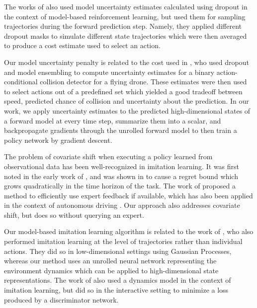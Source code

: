 \documentclass{article} %
\begin{document}
The works of \citep{DeepPilco, Chua2018} also used model uncertainty estimates calculated using dropout in the context of model-based reinforcement learning, but used them for sampling trajectories during the forward prediction step. Namely, they applied different dropout masks to simulate different state trajectories which were then averaged to produce a cost estimate used to select an action. 

Our model uncertainty penalty is related to the cost used in \citep{Kahn2017}, who used dropout and model ensembling to compute uncertainty estimates for a binary action-conditional collision detector for a flying drone. These estimates were then used to select actions out of a predefined set which yielded a good tradeoff between speed, predicted chance of collision and uncertainty about the prediction. In our work, we apply uncertainty estimates to the predicted high-dimensional states of a forward model at every time step, summarize them into a scalar, and backpropagate gradients through the unrolled forward model to then train a policy network by gradient descent.


The problem of covariate shift when executing a policy learned from observational data has been well-recognized in imitation learning.
It was first noted in the early work of \citep{Pomerleau91}, and was shown in \citep{Ross2010EfficientRF} to cause a regret bound which grows quadratically in the time horizon of the task.
The work of \citep{Dagger} proposed a method to efficiently use expert feedback if available, which has also been applied in the context of autonomous driving \citep{Zhang16}.
Our approach also addresses covariate shift, but does so without querying an expert.

Our model-based imitation learning algorithm is related to the work of \citep{Englert2013}, who also performed imitation learning at the level of trajectories rather than individual actions. They did so in low-dimensional settings using Gaussian Processes, whereas our method uses an unrolled neural network representing the environment dynamics which can be applied to high-dimensional state representations. The work of \citep{Baram2017EndtoEndDA} also used a dynamics model in the context of imitation learning, but did so in the interactive setting to minimize a loss produced by a discriminator network. 
\end{document}
